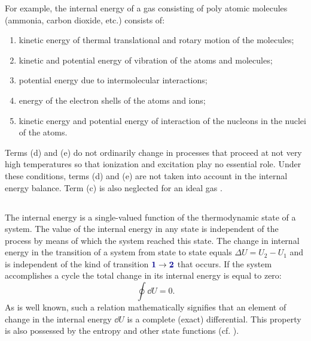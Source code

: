 For example, the internal energy of a gas consisting of poly­ atomic molecules (ammonia, carbon dioxide, etc.) consists of: 
\begin{enumerate}[label=(\alph*)]
\item kinetic energy of thermal translational and rotary motion of the molecules;
\item kinetic and potential energy of vibration of the atoms and molecules;
\item potential energy due to intermolecular interactions;
\item energy of the electron shells of the atoms and ions;
\item kinetic energy and potential energy of interaction of the nucleons  in the nuclei of the atoms.
\end{enumerate}
Terms (d) and (e) do not ordinarily change in processes that proceed at not very high temperatures so that ionization and excitation play no essential role. Under these conditions, terms (d) and (e) are not taken into account in the internal energy balance. Term (c) is also neglected for an ideal gas .

\subsection{}\label{9.1.3} The internal energy is a single-valued function of the thermodynamic state of a system. The value of the internal energy in any state is independent of the process by means of which the system reached this state. The change in internal energy in the transition of a system from state  to state  equals $\Delta U = U_{2} - U_{1}$ and is independent of the kind of transition $\hlblue{1} \to \hlblue{2}$ that occurs. If the system accomplishes a cycle  the total change in its internal energy is equal to zero: 
\begin{equation*}%
\oint \dd U = 0.
\end{equation*}
As is well known, such a relation mathematically signifies that an element of change in the internal energy $\dd U$ is a com­plete (exact) differential. This property is also possessed by the entropy  and other state functions  (cf. ). 

